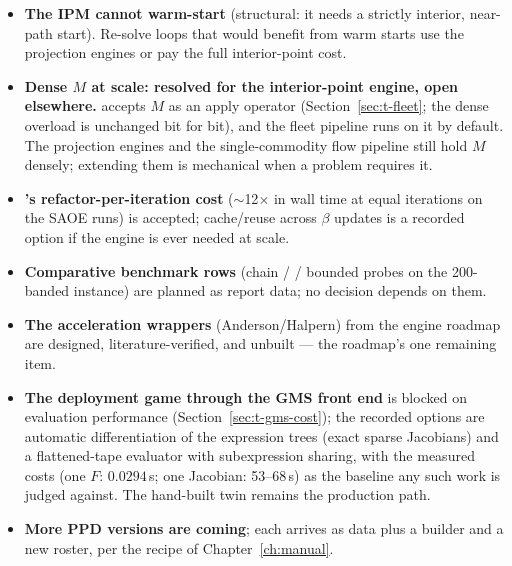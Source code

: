 \begin{itemize}
\item \textbf{The IPM cannot warm-start} (structural: it needs a strictly
  interior, near-path start). Re-solve loops that would benefit from warm
  starts use the projection engines or pay the full interior-point cost.
\item \textbf{Dense $M$ at scale: resolved for the interior-point engine,
  open elsewhere.}  accepts $M$ as an apply operator
  (Section~\ref{sec:t-fleet}; the dense overload is unchanged bit for
  bit), and the fleet pipeline runs on it by default. The projection
  engines and the single-commodity flow pipeline still hold $M$ densely;
  extending them is mechanical when a problem requires it.
\item \textbf{'s refactor-per-iteration cost} ($\sim$12$\times$
   in wall time at equal iterations on the SAOE runs) is
  accepted; cache/reuse across $\beta$ updates is a recorded option if the
  engine is ever needed at scale.
\item \textbf{Comparative benchmark rows} (chain /  /
   bounded probes on the 200-banded instance) are planned as
  report data; no decision depends on them.
\item \textbf{The acceleration wrappers} (Anderson/Halpern) from the engine
  roadmap are designed, literature-verified, and unbuilt --- the roadmap's
  one remaining item.
\item \textbf{The deployment game through the GMS front end} is blocked
  on evaluation performance (Section~\ref{sec:t-gms-cost}); the recorded
  options are automatic differentiation of the expression trees (exact
  sparse Jacobians) and a flattened-tape evaluator with subexpression
  sharing, with the measured costs (one $F$: $0.0294$\,s; one Jacobian:
  53--68\,s) as the baseline any such work is judged against. The
  hand-built twin remains the production path.
\item \textbf{More PPD versions are coming}; each arrives as data plus a
   builder and a new roster, per the recipe of
  Chapter~\ref{ch:manual}.
\end{itemize}
